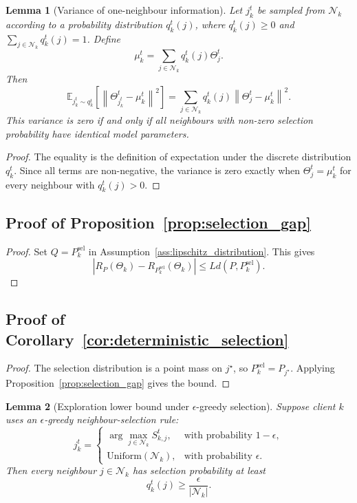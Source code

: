 \documentclass[conference]{IEEEtran}
\newtheorem{lemma}{Lemma}
\begin{document}
\begin{lemma}[Variance of one-neighbour information]
\label{lem:variance_one_neighbour}
Let \(j_k^t\) be sampled from \(\mathcal{N}_k\) according to a probability distribution \(q_k^t(j)\), where \(q_k^t(j)\geq0\) and \(\sum_{j\in\mathcal{N}_k}q_k^t(j)=1\). Define
\[
\mu_k^t
=
\sum_{j\in\mathcal{N}_k}
q_k^t(j)\Theta_j^t .
\]
Then
\[
\mathbb{E}_{j_k^t\sim q_k^t}
\left[
\left\|
\Theta_{j_k^t}^t-\mu_k^t
\right\|^2
\right]
=
\sum_{j\in\mathcal{N}_k}
q_k^t(j)
\left\|
\Theta_j^t-\mu_k^t
\right\|^2 .
\]
This variance is zero if and only if all neighbours with non-zero selection probability have identical model parameters.
\end{lemma}

\begin{proof}
The equality is the definition of expectation under the discrete distribution \(q_k^t\). Since all terms are non-negative, the variance is zero exactly when \(\Theta_j^t=\mu_k^t\) for every neighbour with \(q_k^t(j)>0\).
\end{proof}

\subsection{Proof of Proposition~\ref{prop:selection_gap}}
\begin{proof}
Set \(Q=P_k^{\mathrm{sel}}\) in Assumption~\ref{ass:lipschitz_distribution}. This gives
\[
\left|
R_P(\Theta_k)
-
R_{P_k^{\mathrm{sel}}}(\Theta_k)
\right|
\leq
L d(P,P_k^{\mathrm{sel}}).
\]
\end{proof}

\subsection{Proof of Corollary~\ref{cor:deterministic_selection}}
\begin{proof}
The selection distribution is a point mass on \(j^\star\), so \(P_k^{\mathrm{sel}}=P_{j^\star}\). Applying Proposition~\ref{prop:selection_gap} gives the bound.
\end{proof}

\begin{lemma}[Exploration lower bound under \(\epsilon\)-greedy selection]
\label{lem:epsilon_greedy}
Suppose client \(k\) uses an \(\epsilon\)-greedy neighbour-selection rule:
\[
j_k^t =
\begin{cases}
\arg\max_{j\in\mathcal{N}_k}S_{k,j}^t, & \text{with probability } 1-\epsilon,\\
\text{Uniform}(\mathcal{N}_k), & \text{with probability } \epsilon.
\end{cases}
\]
Then every neighbour \(j\in\mathcal{N}_k\) has selection probability at least
\[
q_k^t(j)
\geq
\frac{\epsilon}{|\mathcal{N}_k|}.
\]
\end{lemma}
\end{document}
